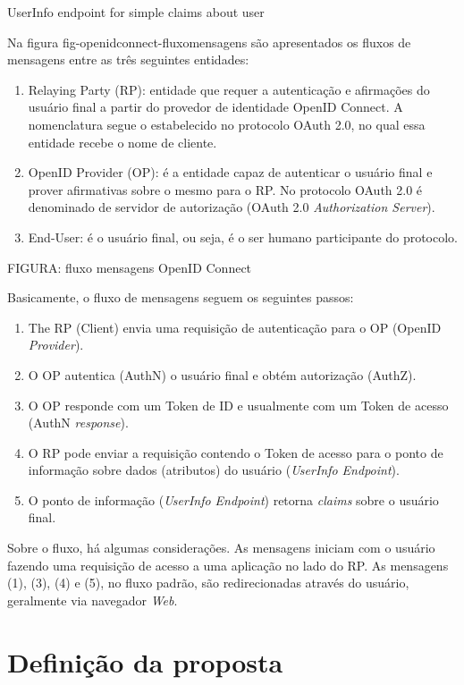 \documentclass{doublecol-new}
\begin{document}
UserInfo endpoint for
simple claims about user

Na figura fig-openidconnect-fluxomensagens são apresentados os fluxos de mensagens entre as três seguintes entidades:

\begin{enumerate}
	\item Relaying Party (RP): entidade que requer a autenticação e afirmações do usuário final a partir do provedor de identidade OpenID Connect. A nomenclatura segue o estabelecido no protocolo OAuth 2.0, no qual essa entidade recebe o nome de cliente.
	\item OpenID Provider (OP): é a entidade capaz de autenticar o usuário final e prover afirmativas sobre o mesmo para o RP. No protocolo OAuth 2.0 é denominado de servidor de autorização (OAuth 2.0 \textit{Authorization Server}).
	\item End-User: é o usuário final, ou seja, é o ser humano participante do protocolo.
\end{enumerate}

FIGURA: fluxo mensagens OpenID Connect

Basicamente, o fluxo de mensagens seguem os seguintes passos:
\begin{enumerate}
	\item The RP (Client) envia uma requisição de autenticação para o OP (OpenID \textit{Provider}).
	\item O OP autentica (AuthN) o usuário final e obtém autorização (AuthZ).
	\item O OP responde com um Token de ID e usualmente com um Token de acesso (AuthN \textit{response}).
	\item O RP pode enviar a requisição contendo o Token de acesso para o ponto de informação sobre dados (atributos) do usuário (\textit{UserInfo Endpoint}).
	\item O ponto de informação (\textit{UserInfo Endpoint}) retorna \textit{claims} sobre o usuário final.
\end{enumerate}

Sobre o fluxo, há algumas considerações. As mensagens iniciam com o usuário fazendo uma requisição de acesso a uma aplicação no lado do RP. As mensagens (1), (3), (4) e (5), no fluxo padrão, são redirecionadas através do usuário, geralmente via navegador \textit{Web}.




\section{Definição da proposta}
\end{document}
